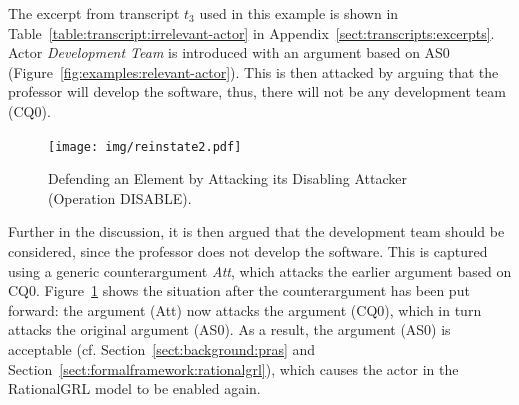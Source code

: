 The excerpt from transcript $t_3$ used in this example is shown in Table~\ref{table:transcript:irrelevant-actor} in Appendix~\ref{sect:transcripts:excerpts}. Actor \emph{Development Team} is introduced with an argument based on AS0 (Figure~\ref{fig:examples:relevant-actor}). This is then attacked by arguing that the professor will develop the software, thus, there will not be any development team (CQ0). 

\begin{figure}[b]
\centering
\texttt{[image: img/reinstate2.pdf]}
\caption{Defending an Element by Attacking its Disabling Attacker (Operation \textsf{DISABLE)}.}
\label{fig:examples:relevant-actor2}
\end{figure}

Further in the discussion, it is then argued that the development team should be considered, since the professor does not develop the software. This is captured using a generic counterargument \emph{Att}, which attacks the earlier argument based on CQ0. Figure~\ref{fig:examples:relevant-actor2} shows the situation after the counterargument has been put forward: the argument (Att) now attacks the argument (CQ0), which in turn attacks the original argument (AS0). As a result, the argument (AS0) is acceptable (cf. Section~\ref{sect:background:pras} and Section~\ref{sect:formalframework:rationalgrl}), which causes the actor in the RationalGRL model to be enabled again.

